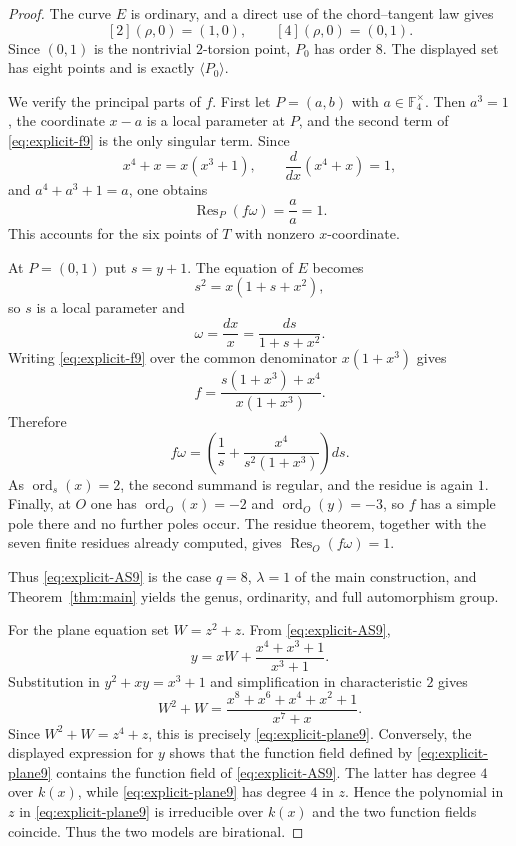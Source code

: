 \documentclass[11pt]{article}
\theoremstyle{remark}
\newcommand{\Res}{\operatorname{Res}}
\newcommand{\F}{\mathbb F}
\begin{document}
\begin{proof}
The curve $E$ is ordinary, and a direct use of the chord--tangent law gives
\[
 [2](\rho,0)=(1,0),\qquad [4](\rho,0)=(0,1).
\]
Since $(0,1)$ is the nontrivial $2$-torsion point, $P_0$ has order $8$.
The displayed set has eight points and is exactly $\langle P_0\rangle$.

We verify the principal parts of $f$.  First let $P=(a,b)$ with
$a\in\F_4^\times$.  Then $a^3=1$, the coordinate $x-a$ is a local
parameter at $P$, and the second term of \eqref{eq:explicit-f9} is the
only singular term.  Since
\[
 x^4+x=x(x^3+1),\qquad
 \frac{d}{dx}(x^4+x)=1,
\]
and $a^4+a^3+1=a$, one obtains
\[
 \Res_P(f\omega)=\frac{a}{a}=1.
\]
This accounts for the six points of $T$ with nonzero $x$-coordinate.

At $P=(0,1)$ put $s=y+1$.  The equation of $E$ becomes
\[
 s^2=x(1+s+x^2),
\]
so $s$ is a local parameter and
\[
 \omega=\frac{dx}{x}=\frac{ds}{1+s+x^2}.
\]
Writing \eqref{eq:explicit-f9} over the common denominator
$x(1+x^3)$ gives
\[
 f=\frac{s(1+x^3)+x^4}{x(1+x^3)}.
\]
Therefore
\[
 f\omega
 =\left(\frac1s+
   \frac{x^4}{s^2(1+x^3)}\right)ds.
\]
As $\operatorname{ord}_s(x)=2$, the second summand is regular, and the
residue is again $1$.  Finally, at $O$ one has
$\operatorname{ord}_O(x)=-2$ and $\operatorname{ord}_O(y)=-3$, so $f$
has a simple pole there and no further poles occur.  The residue theorem,
together with the seven finite residues already computed, gives
$\Res_O(f\omega)=1$.

Thus \eqref{eq:explicit-AS9} is the case $q=8$, $\lambda=1$ of the main
construction, and Theorem~\ref{thm:main} yields the genus, ordinarity, and
full automorphism group.

For the plane equation set $W=z^2+z$.  From
\eqref{eq:explicit-AS9},
\[
 y=xW+\frac{x^4+x^3+1}{x^3+1}.
\]
Substitution in $y^2+xy=x^3+1$ and simplification in characteristic $2$
gives
\[
 W^2+W
 =\frac{x^8+x^6+x^4+x^2+1}{x^7+x}.
\]
Since $W^2+W=z^4+z$, this is precisely
\eqref{eq:explicit-plane9}.  Conversely, the displayed expression for $y$ shows that the function
field defined by \eqref{eq:explicit-plane9} contains the function field
of \eqref{eq:explicit-AS9}.  The latter has degree $4$ over $k(x)$,
while \eqref{eq:explicit-plane9} has degree $4$ in $z$.  Hence the
polynomial in $z$ in \eqref{eq:explicit-plane9} is irreducible over
$k(x)$ and the two function fields coincide.  Thus the two models are
birational.
\end{proof}
\end{document}
